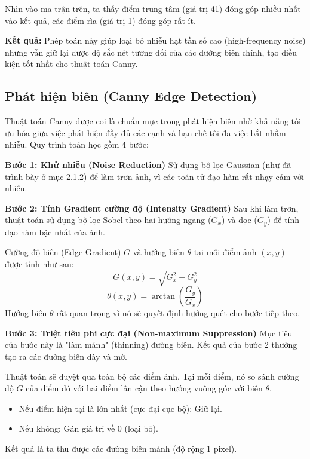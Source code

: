 \documentclass[6pt, a4paper]{report}
\begin{document}
	Nhìn vào ma trận trên, ta thấy điểm trung tâm (giá trị 41) đóng góp nhiều nhất vào kết quả, các điểm rìa (giá trị 1) đóng góp rất ít.
	
	\textbf{Kết quả:} Phép toán này giúp loại bỏ nhiễu hạt tần số cao (high-frequency noise) nhưng vẫn giữ lại được độ sắc nét tương đối của các đường biên chính, tạo điều kiện tốt nhất cho thuật toán Canny.
	
	\subsection{Phát hiện biên (Canny Edge Detection)}
	Thuật toán Canny được coi là chuẩn mực trong phát hiện biên nhờ khả năng tối ưu hóa giữa việc phát hiện đầy đủ các cạnh và hạn chế tối đa việc bắt nhầm nhiễu. Quy trình toán học gồm 4 bước:
	
	\textbf{Bước 1: Khử nhiễu (Noise Reduction)}
	Sử dụng bộ lọc Gaussian (như đã trình bày ở mục 2.1.2) để làm trơn ảnh, vì các toán tử đạo hàm rất nhạy cảm với nhiễu.
	
	\textbf{Bước 2: Tính Gradient cường độ (Intensity Gradient)}
	Sau khi làm trơn, thuật toán sử dụng bộ lọc Sobel theo hai hướng ngang ($G_x$) và dọc ($G_y$) để tính đạo hàm bậc nhất của ảnh.
	
	Cường độ biên (Edge Gradient) $G$ và hướng biên $\theta$ tại mỗi điểm ảnh $(x,y)$ được tính như sau:
	\begin{equation}
		G(x,y) = \sqrt{G_x^2 + G_y^2}
	\end{equation}
	\begin{equation}
		\theta(x,y) = \arctan\left(\frac{G_y}{G_x}\right)
	\end{equation}
	Hướng biên $\theta$ rất quan trọng vì nó sẽ quyết định hướng quét cho bước tiếp theo.
	
	\textbf{Bước 3: Triệt tiêu phi cực đại (Non-maximum Suppression)}
	Mục tiêu của bước này là "làm mảnh" (thinning) đường biên. Kết quả của bước 2 thường tạo ra các đường biên dày và mờ.
	
	Thuật toán sẽ duyệt qua toàn bộ các điểm ảnh. Tại mỗi điểm, nó so sánh cường độ $G$ của điểm đó với hai điểm lân cận theo hướng vuông góc với biên $\theta$.
	\begin{itemize}
		\item Nếu điểm hiện tại là lớn nhất (cực đại cục bộ): Giữ lại.
		\item Nếu không: Gán giá trị về 0 (loại bỏ).
	\end{itemize}
	Kết quả là ta thu được các đường biên mảnh (độ rộng 1 pixel).
	
\end{document}
